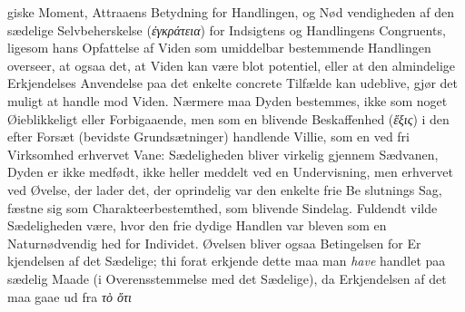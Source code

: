 \documentclass[12pt,a4paper]{book}
\newcommand{\gk}[1]{\textit{#1}}
\begin{document}
giske Moment, Attraaens Betydning for Handlingen, og Nød\-%
vendigheden af den sædelige Selvbeherskelse (\gk{ἐγκράτεια}) for
Indsigtens og Handlingens Congruents, ligesom hans Opfattelse
af Viden som umiddelbar bestemmende Handlingen overseer,
at ogsaa det, at Viden kan være blot potentiel, eller at den
almindelige Erkjendelses Anvendelse paa det enkelte concrete
Tilfælde kan udeblive, gjør det muligt at handle mod Viden.
Nærmere maa Dyden bestemmes, ikke som noget Øieblikkeligt
eller Forbigaaende, men som en blivende Beskaffenhed (\gk{ἕξις})
i den efter Forsæt (bevidste Grundsætninger) handlende Villie,
som en ved fri Virksomhed erhvervet Vane: Sædeligheden
bliver virkelig gjennem Sædvanen, Dyden er ikke medfødt,
ikke heller meddelt ved en Undervisning, men erhvervet ved
Øvelse, der lader det, der oprindelig var den enkelte frie Be\-%
slutnings Sag, fæstne sig som Charakteerbestemthed, som
blivende Sindelag. Fuldendt vilde Sædeligheden være, hvor
den frie dydige Handlen var bleven som en Naturnødvendig\-%
hed for Individet. Øvelsen bliver ogsaa Betingelsen for Er\-%
kjendelsen af det Sædelige; thi forat erkjende dette maa man
\emph{have} handlet paa sædelig Maade (i Overensstemmelse med
det Sædelige), da Erkjendelsen af det maa gaae ud fra \gk{τὸ ὅτι}
\end{document}
